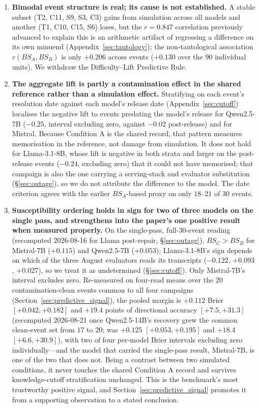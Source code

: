 \documentclass[11pt,journal,onecolumn]{IEEEtran}
\begin{document}
\begin{enumerate}
    \item \textbf{Bimodal event structure is real; its cause is not established.} A stable subset (T2, C11, S9, S3, C3) gains from simulation across all models and another (T1, C10, C15, S6) loses, but the $r=0.847$ correlation previously advanced to explain this is an arithmetic artifact of regressing a difference on its own minuend (Appendix~\ref{sec:tautology}); the non-tautological association $r(BS_A, BS_B)$ is only $+0.206$ across events ($+0.130$ over the $90$ individual units). We withdraw the Difficulty--Lift Predictive Rule.
    \item \textbf{The aggregate lift is partly a contamination effect in the shared reference rather than a simulation effect.} Stratifying on each event's resolution date against each model's release date (Appendix~\ref{sec:cutoff}) localises the negative lift to events predating the model's release for Qwen2.5-7B ($-0.25$, interval excluding zero, against $-0.02$ post-release) and for Mistral. Because Condition A is the shared record, that pattern measures memorisation in the reference, not damage from simulation. It does not hold for Llama-3.1-8B, whose lift is negative in both strata and larger on the post-release events ($-0.24$, excluding zero) that it could not have memorised; that campaign is also the one carrying a serving-stack and evaluator substitution (\S\ref{sec:outage}), so we do not attribute the difference to the model. The date criterion agrees with the earlier $BS_A$-based proxy on only $18$--$21$ of $30$ events.
    \item \textbf{Susceptibility ordering holds in sign for two of three models on the single pass, and strengthens into the paper's one positive result when measured properly.} On the single-pass, full-30-event reading (recomputed 2026-08-16 for Llama post-repair, \S\ref{sec:outage}), $BS_C > BS_B$ for Mistral-7B ($+0.115$) and Qwen2.5-7B ($+0.053$); Llama-3.1-8B's sign depends on which of the three August evaluators reads its transcripts ($-0.122$, $+0.093$, $+0.027$), so we treat it as undetermined (\S\ref{sec:cutoff}). Only Mistral-7B's interval excludes zero. Re-measured on four-read means over the $20$ contamination-clean events common to all four campaigns (Section~\ref{sec:predictive_signal}), the pooled margin is $+0.112$ Brier $[+0.042, +0.182]$ and $+19.4$ points of directional accuracy $[+7.5, +31.3]$ (recomputed 2026-08-21 once Qwen2.5-14B's recovery grew the common clean-event set from $17$ to $20$; was $+0.125$ $[+0.053,+0.195]$ and $+18.4$ $[+6.6,+30.9]$), with two of four per-model Brier intervals excluding zero individually---and the model that carried the single-pass result, Mistral-7B, is one of the two that does not. Being a contrast between two simulated conditions, it never touches the shared Condition A record and survives knowledge-cutoff stratification unchanged. This is the benchmark's most trustworthy positive signal, and Section~\ref{sec:predictive_signal} promotes it from a supporting observation to a stated conclusion.

\end{enumerate}
\end{document}
